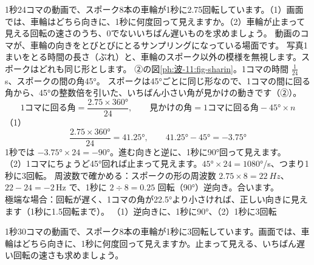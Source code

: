 \label{ph:波-11:ex2}
\begin{phreidai}
1秒24コマの動画で、スポーク8本の車輪が1秒に2.75回転しています。（1）画面では、車輪はどちら向きに、1秒に何度回って見えますか。（2）車輪が止まって見える回転の速さのうち、0でないいちばん遅いものを求めましょう。
\phbamen
動画のコマが、車輪の向きをとびとびにとるサンプリングになっている場面です。
\phmushi
写真1まいをとる時間の長さ（ぶれ）と、車輪のスポーク以外の模様を無視します。スポークはどれも同じ形とします。
\phzu
②の図\ref{ph:波-11:fig-sharin}。1コマの時間 $\tfrac{1}{24}$\,s、スポークの間の角\ang{45}。
\phriyu
スポークは\ang{45}ごとに同じ形なので、1コマの間に回る角から、\ang{45}の整数倍を引いた、いちばん小さい角が見かけの動きです（②）。
\phtateru
\[\text{1コマに回る角}=\frac{2.75\times360°}{24},\qquad\text{見かけの角}=\text{1コマに回る角}-45°\times n\]
\phtoku
（1）\[\frac{2.75\times360°}{24}=41.25°,\qquad 41.25°-45°=-3.75°\]
1秒では $-3.75°\times24=-90°$。進む向きと逆に、1秒に\ang{90}回って見えます。\\
（2）1コマにちょうど\ang{45}回れば止まって見えます。$\ang{45}\times24=\ang{1080}$/s、つまり1秒に3回転。
\phtashikame
周波数で確かめる：スポークの形の周波数 $2.75\times8=\qty{22}{Hz}$、$22-24=-2$\,Hz で、1秒に $2\div8=0.25$ 回転（\ang{90}）逆向き。合います。\\
極端な場合：回転が遅く、1コマの角が\ang{22.5}より小さければ、正しい向きに見えます（1秒に1.5回転まで）。
\kotae （1）逆向きに、1秒に\ang{90}、（2）1秒に3回転
\end{phreidai}
\begin{jibun}
1秒30コマの動画で、スポーク8本の車輪が1秒に3回転しています。画面では、車輪はどちら向きに、1秒に何度回って見えますか。止まって見える、いちばん遅い回転の速さも求めましょう。
\end{jibun}

